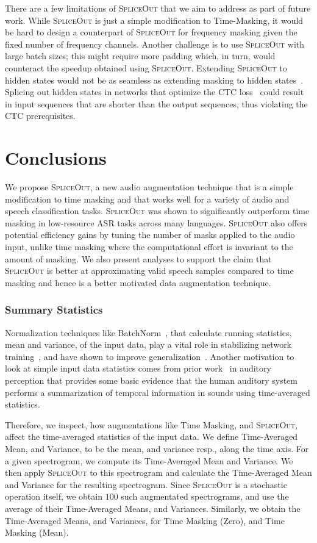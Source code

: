 \documentclass{article}
\newcommand{\SpA}{{\textsc{SpliceOut}}\xspace}
\begin{document}
There are a few limitations of \SpA that we aim to address as part of future work. While \SpA is just a simple modification to Time-Masking, it would be hard to design a counterpart of \SpA for frequency masking given the fixed number of frequency channels. Another challenge is to use \SpA with large batch sizes; this might require more padding which, in turn, would counteract the speedup obtained using \SpA. Extending \SpA to hidden states would not be as seamless as extending masking to hidden states~\cite{specaugmentpp}. Splicing out hidden states in networks that optimize the CTC loss~\cite{ctc} could result in input sequences that are shorter than the output sequences, thus violating the CTC prerequisites. 

\section{Conclusions}
\label{sec:conclusions}
We propose \SpA, a new audio augmentation technique that is a simple modification to time masking and that works well for a variety of audio and speech classification tasks. \SpA was shown to significantly outperform time masking in low-resource ASR tasks across many languages. \SpA also offers potential efficiency gains by tuning the number of masks applied to the audio input, unlike time masking where the computational effort is invariant to the amount of masking. We also present analyses to support the claim that \SpA is better at approximating valid speech samples compared to time masking and hence is a better motivated data augmentation technique.

\iffalse
\subsubsection{Summary Statistics}
Normalization techniques like BatchNorm~\citep{}, that calculate running statistics, mean and variance, of the input data, play a vital role in stabilizing network training~\citep{}, and have shown to improve generalization~\citep{}. Another motivation to look at simple input data statistics comes from prior work~\citep{summary1,summary2} in auditory perception that provides some basic evidence that the human auditory system performs a summarization of temporal information in sounds using time-averaged statistics.

Therefore, we inspect, how augmentations like Time Masking, and \SpA, affect the time-averaged statistics of the input data. We define Time-Averaged Mean, and Variance, to be the mean, and variance resp., along the time axis. For a given spectrogram, we compute its Time-Averaged Mean and Variance. We then apply \SpA to this spectrogram and calculate the Time-Averaged Mean and Variance for the resulting spectrogram. Since \SpA is a stochastic operation itself, we obtain $100$ such augmentated spectrograms, and use the average of their Time-Averaged Means, and Variances. Similarly, we obtain the Time-Averaged Means, and Variances, for Time Masking (Zero), and Time Masking (Mean). 
\end{document}
